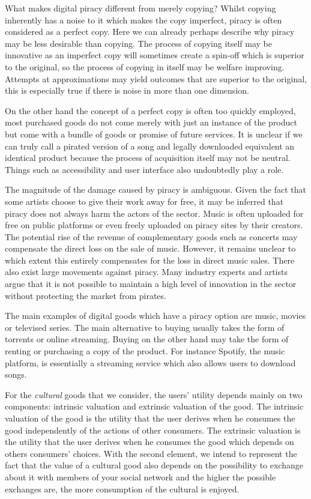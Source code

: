 \documentclass[12pt]{report}
\numberwithin{equation}{section}
\begin{document}
What makes digital piracy different from merely copying? Whilst copying inherently has a noise to it which makes the copy imperfect, piracy is often considered as a perfect copy. Here we can already perhaps describe why piracy may be less desirable than copying. The process of copying itself may be innovative as an imperfect copy will sometimes create a spin-off which is superior to the original, so the process of copying in itself may be welfare improving. Attempts at approximations may yield outcomes that are superior to the original, this is especially true if there is noise in more than one dimension.

On the other hand the concept of a perfect copy is often too quickly employed, most purchased goods do not come merely with just an instance of the product but come with a bundle of goods or promise of future services. It is unclear if we can truly call a pirated version of a song and legally downloaded equivalent an identical product because the process of acquisition itself may not be neutral. Things such as accessibility and user interface also undoubtedly play a role.
\fi

The magnitude of the damage caused by piracy is ambiguous. Given the fact that some artists choose to give their work away for free, it may be inferred that piracy does not always harm the actors of the sector. Music is often uploaded for free on public platforms or even freely uploaded on piracy sites by their creators. The potential rise of the revenue of complementary goods such as concerts may compensate the direct loss on the sale of music. However, it remains unclear to which extent this entirely compensates for the loss in direct music sales. There also exist large movements against piracy. Many industry experts and artists argue that it is not possible to maintain a high level of innovation in the sector without protecting the market from pirates.

The main examples of digital goods which have a piracy option are music, movies or televised series. The main alternative to buying usually takes the form of torrents or online streaming. Buying on the other hand may take the form of renting or purchasing a copy of the product. For instance Spotify, the music platform, is essentially a streaming service which also allows users to download songs.

For the \textit{cultural} goods that we consider, the users' utility depends mainly on two components:  intrinsic valuation and extrinsic valuation of the good. The intrinsic valuation of the good is the utility that the user derives when he consumes the good independently of the actions of other consumers. The extrinsic valuation is the utility that the user derives when he consumes the good which depends on others consumers' choices. With the second element, we intend to represent the fact that the value of a cultural good also depends on the possibility to exchange about it with members of your social network and the higher the possible exchanges are, the more consumption of the cultural is enjoyed. 
\end{document}
